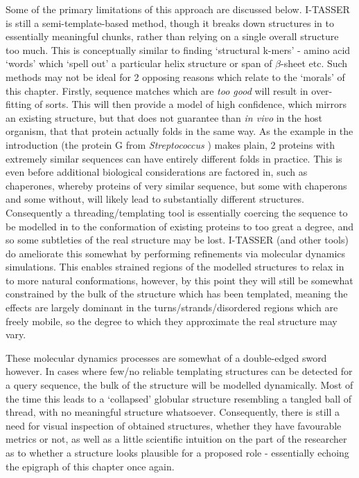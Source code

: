 Some of the primary limitations of this approach are discussed below. I-TASSER is still a semi-template-based method, though it breaks down structures in to essentially meaningful chunks, rather than relying on a single overall structure too much. This is conceptually similar to finding `structural k-mers' - amino acid `words' which `spell out' a particular helix structure or span of $\beta$-sheet etc. Such methods may not be ideal for 2 opposing reasons which relate to the `morals' of this chapter. Firstly, sequence matches which are \emph{too good} will result in over-fitting of sorts. This will then provide a model of high confidence, which mirrors an existing structure, but that does not guarantee than \emph{in vivo} in the host organism, that that protein actually folds in the same way. As the example in the introduction (the protein G from \emph{Streptococcus} \citep{Alexander2007}) makes plain, 2 proteins with extremely similar sequences can have entirely different folds in practice. This is even before additional biological considerations are factored in, such as chaperones, whereby proteins of very similar sequence, but some with chaperons and some without, will likely lead to substantially different structures. Consequently a threading/templating tool is essentially coercing the sequence to be modelled in to the conformation of existing proteins to too great a degree, and so some subtleties of the real structure may be lost. I-TASSER (and other tools) do ameliorate this somewhat by performing refinements via molecular dynamics simulations. This enables strained regions of the modelled structures to relax in to more natural conformations, however, by this point they will still be somewhat constrained by the bulk of the structure which has been templated, meaning the effects are largely dominant in the turns/strands/disordered regions which are freely mobile, so the degree to which they approximate the real structure may vary.

These molecular dynamics processes are somewhat of a double-edged sword however. In cases where few/no reliable templating structures can be detected for a query sequence, the bulk of the structure will be modelled dynamically. Most of the time this leads to a `collapsed' globular structure resembling a tangled ball of thread, with no meaningful structure whatsoever. Consequently, there is still a need for visual inspection of obtained structures, whether they have favourable metrics or not, as well as a little scientific intuition on the part of the researcher as to whether a structure looks plausible for a proposed role - essentially echoing the epigraph of this chapter once again.

